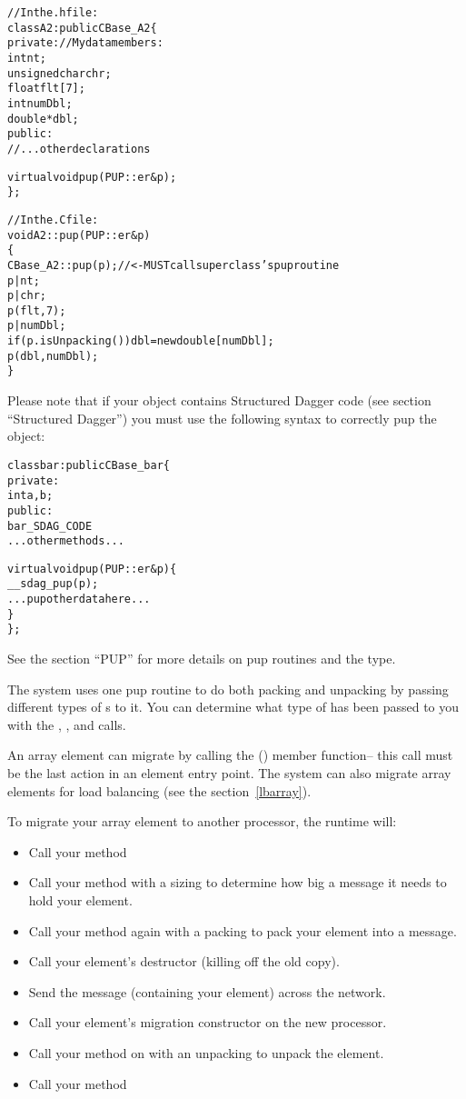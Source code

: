 \begin{alltt}
//In the .h file:
class A2 : public CBase\_A2 \{
private: //My data members:
    int nt;
    unsigned char chr;
    float flt[7];
    int numDbl;
    double *dbl;
public:	
    //...other declarations

    virtual void pup(PUP::er \&p);
\};

//In the .C file:
void A2::pup(PUP::er \&p)
\{
    CBase\_A2::pup(p); //<- MUST call superclass's pup routine
    p|nt;
    p|chr;
    p(flt,7);
    p|numDbl;
    if (p.isUnpacking()) dbl=new double[numDbl];
    p(dbl,numDbl);
\}
\end{alltt}

Please note that if your object contains Structured Dagger code (see section ``Structured Dagger'') you must use the following syntax to correctly pup the object:

\begin{alltt}
class bar: public CBase\_bar \{
 private:
    int a,b;
 public:
    bar_SDAG_CODE 
    ...other methods...

    virtual void pup(PUP::er& p) \{
      __sdag_pup(p);
      ...pup other data here...
    \}
\};
\end{alltt}

See the  section ``PUP'' for more details on pup routines
and the  type.

The system uses one pup routine to do both packing and unpacking by
passing different types of s to it.  You can determine
what type of  has been passed to you with the
, , and  calls.

An array element can migrate by calling the () member function-- this call must be the last action
in an element entry point.  The system can also migrate array elements
for load balancing (see the section~\ref{lbarray}).

To migrate your array element to another processor, the \charmpp{}
runtime will:

\begin{itemize}
\item Call your  method
\item Call your  method with a sizing  to determine how 
big a message it needs to hold your element.
\item Call your  method again with a packing  to pack 
your element into a message.
\item Call your element's destructor (killing off the old copy).
\item Send the message (containing your element) across the network.
\item Call your element's migration constructor on the new processor.
\item Call your  method on with an unpacking  to unpack 
the element.
\item Call your  method
\end{itemize}

